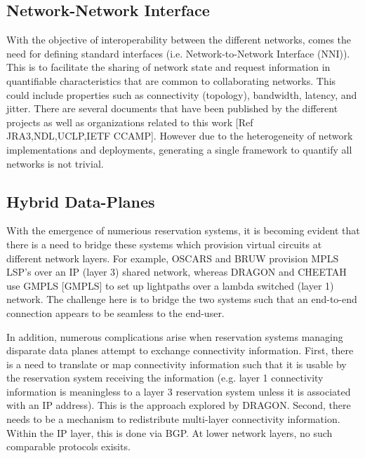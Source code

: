 \documentclass[conference]{IEEEtran}
\begin{document}
\subsection{Network-Network Interface}
With the objective of interoperability between the different networks,
comes the need for defining standard interfaces (i.e. Network-to-Network
Interface (NNI)).  This is to facilitate the sharing of network state and
request information in quantifiable characteristics that are common to
collaborating networks.  This could include properties such as connectivity
(topology), bandwidth, latency, and jitter.  There are several documents
that have been published by the different projects as well as organizations
related to this work [Ref JRA3,NDL,UCLP,IETF CCAMP]. However due to the
heterogeneity of network implementations and deployments, generating a single
framework to quantify all networks is not trivial.

\subsection{Hybrid Data-Planes}
With the emergence of numerious reservation systems, it is becoming evident 
that there is a need to bridge these systems which provision virtual circuits 
at different network layers.
For example, OSCARS and BRUW provision MPLS LSP's over an IP (layer 3) shared 
network, whereas DRAGON and CHEETAH use
GMPLS [GMPLS] to set up lightpaths over a lambda switched (layer 1) network.
The challenge here is to bridge the two systems such
that an end-to-end connection appears to be seamless to the end-user.

In addition, numerous complications arise when reservation systems managing 
disparate data planes attempt to exchange connectivity information.  First, 
there is a need to translate or map connectivity information such that it is 
usable by the reservation system receiving the information (e.g. layer 1 
connectivity information is meaningless to a layer 3 reservation system unless 
it is associated with an IP address).  This is the approach explored by DRAGON.
Second, there needs to be a mechanism to redistribute multi-layer connectivity 
information. Within the IP layer, this is done via BGP.  At lower network 
layers, no such comparable protocols exisits.

\end{document}
